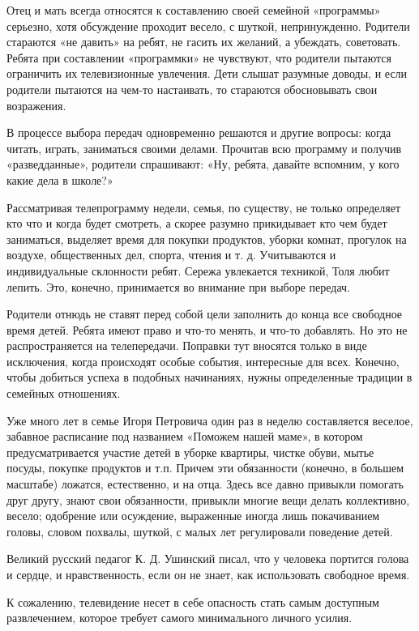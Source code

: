 \documentclass[12pt, a4paper, openany]{book}
\begin{document}
Отец и мать всегда относятся к составлению своей семейной «программы» серьезно, хотя обсуждение проходит весело, с шуткой, непринужденно. Родители стараются «не давить» на ребят, не гасить их желаний, а убеждать, советовать. Ребята при составлении «программки» не чувствуют, что родители пытаются ограничить их телевизионные увлечения. Дети слышат разумные доводы, и если родители пытаются на чем-то настаивать, то стараются обосновывать свои возражения. 

В процессе выбора передач одновременно решаются и другие вопросы: когда читать, играть, заниматься своими делами. Прочитав всю программу и получив «разведданные», родители спрашивают: «Ну, ребята, давайте вспомним, у кого какие дела в школе?» 

Рассматривая телепрограмму недели, семья, по существу, не только определяет кто что и когда будет смотреть, а скорее разумно прикидывает кто чем будет заниматься, выделяет время для покупки продуктов, уборки комнат, прогулок на воздухе, общественных дел, спорта, чтения и т. д. Учитываются и индивидуальные склонности ребят. Сережа увлекается техникой, Толя любит лепить. Это, конечно, принимается во внимание при выборе передач. 

Родители отнюдь не ставят перед собой цели заполнить до конца все свободное время детей. Ребята имеют право и что-то менять, и что-то добавлять. Но это не распространяется на телепередачи. Поправки тут вносятся только в виде исключения, когда происходят особые события, интересные для всех. Конечно, чтобы добиться успеха в подобных начинаниях, нужны определенные традиции в семейных отношениях. 

Уже много лет в семье Игоря Петровича один раз в неделю составляется веселое, забавное расписание под названием «Поможем нашей маме», в котором предусматривается участие детей в уборке квартиры, чистке обуви, мытье посуды, покупке продуктов и т.п. Причем эти обязанности (конечно, в большем масштабе) ложатся, естественно, и на отца. Здесь все давно привыкли помогать друг другу, знают свои обязанности, привыкли многие вещи делать коллективно, весело; одобрение или осуждение, выраженные иногда лишь покачиванием головы, словом похвалы, шуткой, с малых лет регулировали поведение детей. 

Великий русский педагог К. Д. Ушинский писал, что у человека портится голова и сердце, и нравственность, если он не знает, как использовать свободное время. 

К сожалению, телевидение несет в себе опасность стать самым доступным развлечением, которое требует самого минимального личного усилия. 
\end{document}

